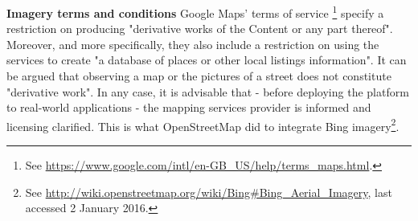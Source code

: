 \textbf{Imagery terms and conditions} Google Maps' terms of service \footnote{See \url{https://www.google.com/intl/en-GB_US/help/terms_maps.html}.} specify a restriction on producing "derivative works of the Content or any part thereof". Moreover, and more specifically, they also include a restriction on using the services to create "a database of places or other local listings information". It can be argued that observing a map or the pictures of a street does not constitute "derivative work". In any case, it is advisable that - before deploying the platform to real-world applications - the mapping services provider is informed and licensing clarified. This is what OpenStreetMap did to integrate Bing imagery\footnote{See \url{http://wiki.openstreetmap.org/wiki/Bing#Bing_Aerial_Imagery}, last accessed 2 January 2016.}.
